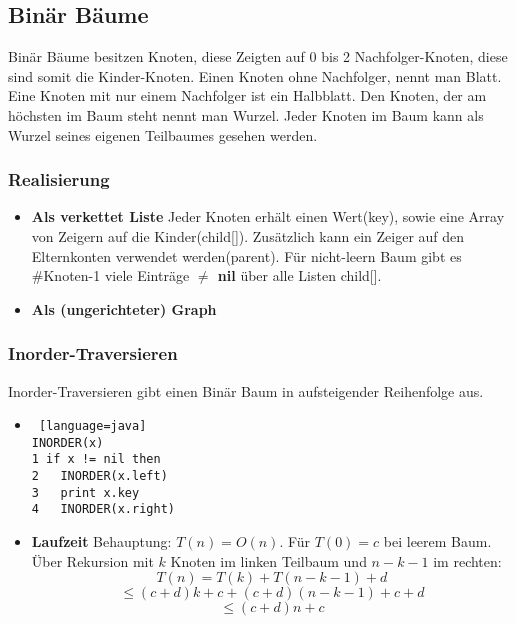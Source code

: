 \documentclass[jou,apacite]{apa6}
\begin{document}
\subsection{Binär Bäume}

Binär Bäume besitzen Knoten, diese Zeigten auf 0 bis 2 Nachfolger-Knoten, diese sind somit die Kinder-Knoten. Einen Knoten ohne Nachfolger, nennt man Blatt. Eine Knoten mit nur einem Nachfolger ist ein Halbblatt. Den Knoten, der am höchsten im Baum steht nennt man Wurzel. Jeder Knoten im Baum kann als Wurzel seines eigenen Teilbaumes gesehen werden. 

\subsubsection{Realisierung}
\begin{itemize}
    \item {\bfseries Als verkettet Liste} Jeder Knoten erhält einen Wert(key), sowie eine Array von Zeigern auf die Kinder(child[]). Zusätzlich kann ein Zeiger auf den Elternkonten verwendet werden(parent). Für nicht-leern Baum gibt es \#Knoten-1 viele Einträge {\bfseries $\neq$ nil} über alle Listen child[].
    \item {\bfseries Als (ungerichteter) Graph}
\end{itemize}

\subsubsection{Inorder-Traversieren}
Inorder-Traversieren gibt einen Binär Baum in aufsteigender Reihenfolge aus.
\begin{itemize}
    \item 
    \begin{lstlisting} [language=java]
INORDER(x)
1 if x != nil then
2   INORDER(x.left)
3   print x.key
4   INORDER(x.right)
\end{lstlisting}
\item {\bfseries Laufzeit} Behauptung: $T(n)=O(n)$. Für $T(0)=c$ bei leerem Baum. Über Rekursion mit $k$ Knoten im linken Teilbaum und $n-k-1$ im rechten: \[T(n)=T(k) + T (n-k-1) + d \]\[ \leq (c+d)k+c+(c+d)(n-k-1)+c+d \]\[ \leq (c+d)n+c\]
\end{itemize}
\end{document}
